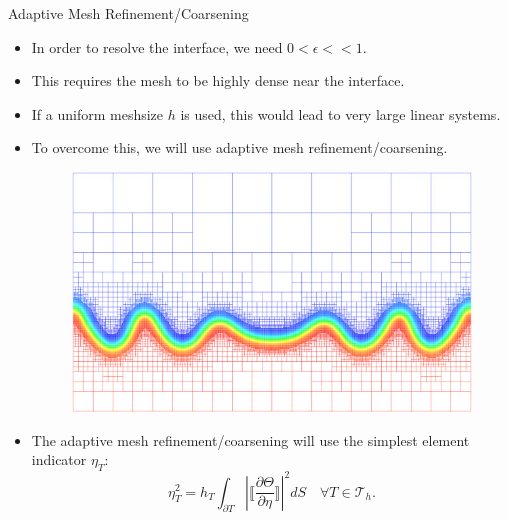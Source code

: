 \documentclass[9pt]{beamer}
\newcommand{\abs}[1]{\left\vert#1\right\vert}
\newcommand{\eps}{\epsilon}
\begin{document}
\begin{frame}{Adaptive Mesh Refinement/Coarsening}
	\begin{itemize}
		\item In order to resolve the interface, we need $0 < \eps << 1$.
		\item This requires the mesh to be highly dense near the interface.
		\item If a uniform meshsize $h$ is used, this would lead to very large linear systems.
		\item To overcome this, we will use adaptive mesh refinement/coarsening.
		\begin{figure}[!ht]
			\centering
			\includegraphics[scale=.4]{Mesh.jpg}
		\end{figure}
		\item The adaptive mesh refinement/coarsening will use the simplest element indicator $\eta_T$:
		$$
			\eta_T^2 = h_T\int_{\partial T}\abs{\bigg\llbracket\frac{\partial \Theta}{\partial \eta}\bigg\rrbracket}^2dS \quad \forall T\in\mathcal{T}_h.
		$$
	\end{itemize}
\end{frame}
\end{document}
